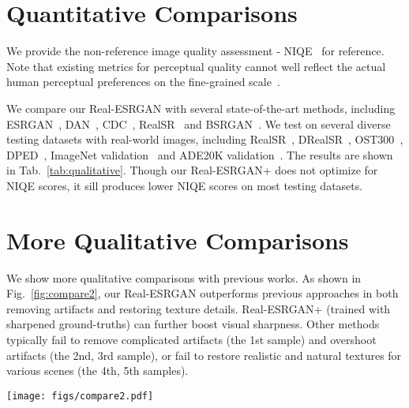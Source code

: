 \documentclass[10pt,twocolumn,letterpaper]{article}
\begin{document}
\section{Quantitative Comparisons}\label{sec:quantitative}

We provide the non-reference image quality assessment - NIQE~\cite{mittal2013making} for reference. Note that existing metrics for perceptual quality cannot well reflect the actual human perceptual preferences on the fine-grained scale~\cite{blau20182018}.

We compare our Real-ESRGAN with several state-of-the-art methods, including ESRGAN~\cite{wang2018esrgan}, DAN~\cite{luo2020unfolding}, CDC~\cite{wei2020cdc}, RealSR~\cite{ji2020real} and BSRGAN~\cite{zhang2021designing}.
We test on several diverse testing datasets with real-world images, including RealSR~\cite{cai2019toward}, DRealSR~\cite{wei2020cdc}, OST300~\cite{wang2018sftgan}, DPED~\cite{ignatov2017dslr}, ImageNet validation~\cite{deng2009imagenet} and ADE20K validation~\cite{zhou2019semantic}.
The results are shown in Tab.~\ref{tab:qualitative}. Though our Real-ESRGAN+ does not optimize for NIQE scores, it sill produces lower NIQE scores on most testing datasets.
\section{More Qualitative Comparisons}\label{sec:more_results}
We show more qualitative comparisons with previous works. As shown in Fig.~\ref{fig:compare2}, our \mbox{Real-ESRGAN} outperforms previous approaches in both removing artifacts and restoring texture details. Real-ESRGAN+ (trained with sharpened ground-truths) can further boost visual sharpness.
Other methods typically fail to remove complicated artifacts (the 1st sample) and overshoot artifacts (the 2nd, 3rd sample), or fail to restore realistic and natural textures for various scenes (the 4th, 5th samples).

\begin{figure*}
	\vspace{-0.2cm}
	\begin{center}
\texttt{[image: figs/compare2.pdf]}
	\end{center}
	\vspace{-0.5cm}
	\caption{Qualitative comparisons on several representative real-world samples with upsampling scale factor of 4. Our \mbox{Real-ESRGAN} outperforms previous approaches in both removing artifacts and restoring texture details. Real-ESRGAN+ (trained with sharpened ground-truths) can further boost visual sharpness.
		Other methods typically fail to remove complicated artifacts (the 1st sample) and overshoot artifacts (the 2nd, 3rd sample), or fail to restore realistic and natural textures for various scenes (the 4th, 5th samples).
		(\textbf{Zoom in for best view})}
	\label{fig:compare2}
\end{figure*}
 
\end{document}
